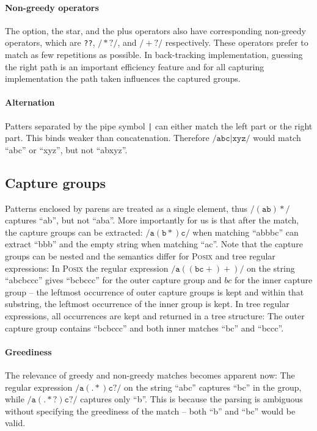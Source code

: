 \documentclass[11pt,a4paper,twoside,openright]{Thesis}
\theoremstyle{definition}
\newcommand{\regex}[1]{\ensuremath{\mathtt{/#1/}}}
\newcommand{\str}[1]{``#1''}
\begin{document}
\paragraph{Non-greedy operators} The option, the star, and the plus operators
also have corresponding non-greedy operators, which are \texttt{??},
\regex{*?}, and \regex{+?} respectively. These operators prefer to match as
few repetitions as possible. In back-tracking implementation, guessing the
right path is an important efficiency feature and for all capturing
implementation the path taken influences the captured groups.

\paragraph{Alternation} Patters separated by the pipe symbol \texttt{|} can
either match the left part or the right part. This binds weaker than
concatenation. Therefore \regex{abc|xyz} would match \str{abc} or \str{xyz}, but not
\str{abxyz}.

\subsection{Capture groups}
Patterns enclosed by parens are treated as a single element, thus
\regex{(ab)*} captures \str{ab}, but not \str{aba}. More importantly for us is that
after the match, the capture groups can be extracted: \regex{a(b*)c} when
matching \str{abbbc} can extract \str{bbb} and the empty string when matching \str{ac}.
Note that the capture groups can be nested and the semantics differ for
\textsc{Posix} and tree regular expressions: In \textsc{Posix} the regular expression
\regex{a((bc+)+)} on the string \str{abcbccc} gives \str{bcbccc} for the outer
capture group and $bc$ for the inner capture group -- the leftmost occurrence of
outer capture groups is kept and within that substring, the leftmost occurrence
of the inner group is kept. In tree regular expressions, all occurrences are
kept and returned in a tree structure: The outer capture group contains
\str{bcbccc} and both inner matches \str{bc} and \str{bccc}.

\paragraph{Greediness}
The relevance of greedy and non-greedy matches becomes apparent now: The
regular expression \regex{a(.*)c?} on the string \str{abc} captures \str{bc} in
the group, while \regex{a(.*?)c?} captures only \str{b}. This is because
the parsing is ambiguous without specifying the greediness of the match -- both
\str{b} and \str{bc} would be valid.
\end{document}
